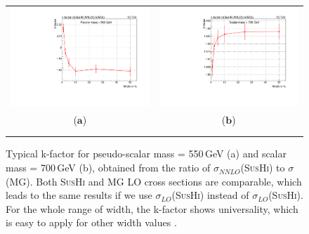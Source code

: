 \begin{figure}[h]
\centering
\begin{tabular}{cc}
\hspace{-0.5cm}
\includegraphics[scale=0.4]{fig/chapt4/k_factor_PScalar_m550_res.pdf}
& \hspace{-0.95cm} \includegraphics[scale=0.4]{fig/chapt4/k_factor_Scalar_m700_res.pdf}\\
($\mathbf{a}$)\qquad\qquad&($\mathbf{b}$)\qquad\qquad\\ \\
\caption{Typical k-factor for pseudo-scalar mass = 550\,GeV (a) and scalar mass = 700\,GeV (b), obtained from the ratio of $\sigma_{NNLO}$(\textsc{SusHi}) to $\sigma$(MG). Both \textsc{SusHi} and MG LO cross sections are comparable, which leads to the same results if we use $\sigma_{LO}$(\textsc{SusHi}) instead of $\sigma_{LO}$(\textsc{SusHi}). For the whole range of width, the k-factor shows universality, which is easy to apply for other width values \label{fig:k_factor}.}
\end{tabular}
\end{figure}

